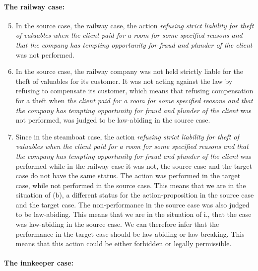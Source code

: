 			
			\paragraph{The railway case:}
			
			\begin{enumerate}[leftmargin=4\parindent]
				\setcounter{enumi}{4}
				
				\item In the source case, the railway case, the action \textit{refusing strict liability for theft of valuables when the client paid for a room for some specified reasons and that the company has tempting opportunity for fraud and plunder of the client} was not performed. 
				\item In the source case, the railway company was not held strictly liable for the theft of valuables for its customer. It was not acting against the law by refusing to compensate its customer, which means that refusing compensation for a theft when \textit{the client paid for a room for some specified reasons and that the company has tempting opportunity for fraud and plunder of the client} was not performed, was judged to be law-abiding in the source case.
				\item Since in the steamboat case, the action \textit{refusing strict liability for theft of valuables when the client paid for a room for some specified reasons and that the company has tempting opportunity for fraud and plunder of the client} was performed while in the railway case it was not, the source case and the target case do not have the same status. The action was performed in the target case, while not performed in the source case. This means that we are in the situation of (b), a different status for the action-proposition in the source case and the target case. The non-performance in the source case was also judged to be law-abiding. This means that we are in the situation of i., that the case was law-abiding in the source case. We can therefore infer that the performance in the target case should be law-abiding or law-breaking. This means that this action could be either forbidden or legally permissible. 
				
			\end{enumerate}
			
			
			\paragraph{The innkeeper case:}
			
